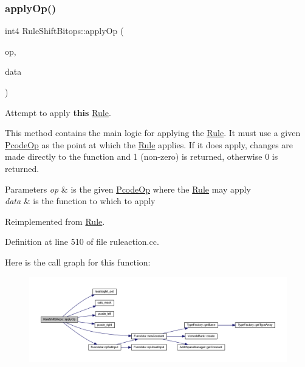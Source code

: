 \subsubsection{\texorpdfstring{applyOp()}{applyOp()}}
{\footnotesize\ttfamily int4 Rule\+Shift\+Bitops\+::apply\+Op (\begin{DoxyParamCaption}\item[{\mbox{\hyperlink{class_pcode_op}{Pcode\+Op}} $\ast$}]{op,  }\item[{\mbox{\hyperlink{class_funcdata}{Funcdata}} \&}]{data }\end{DoxyParamCaption})\hspace{0.3cm}{\ttfamily [virtual]}}



Attempt to apply {\bfseries{this}} \mbox{\hyperlink{class_rule}{Rule}}. 

This method contains the main logic for applying the \mbox{\hyperlink{class_rule}{Rule}}. It must use a given \mbox{\hyperlink{class_pcode_op}{Pcode\+Op}} as the point at which the \mbox{\hyperlink{class_rule}{Rule}} applies. If it does apply, changes are made directly to the function and 1 (non-\/zero) is returned, otherwise 0 is returned. 
\begin{DoxyParams}{Parameters}
{\em op} & is the given \mbox{\hyperlink{class_pcode_op}{Pcode\+Op}} where the \mbox{\hyperlink{class_rule}{Rule}} may apply \\
\hline
{\em data} & is the function to which to apply \\
\hline
\end{DoxyParams}


Reimplemented from \mbox{\hyperlink{class_rule_a4e3e61f066670175009f60fb9dc60848}{Rule}}.



Definition at line 510 of file ruleaction.\+cc.

Here is the call graph for this function\+:
\nopagebreak
\begin{figure}[H]
\begin{center}
\leavevmode
\includegraphics[width=350pt]{class_rule_shift_bitops_acdfd1b4d0a22a3e8f15d632e810d5737_cgraph}
\end{center}
\end{figure}
\mbox{\label{class_rule_shift_bitops_a3761b74c43ffef291151dc947761e17b}} 
